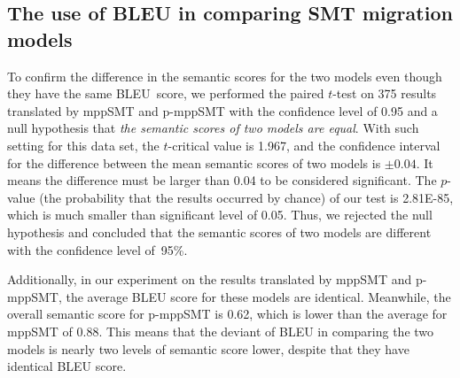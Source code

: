 \subsection{The use of BLEU in comparing SMT migration models}

To confirm the difference in the semantic scores for the two
models even though they have the same BLEU~score, we performed the
paired $t$-test\cite{geek_2015} on 375 results translated by mppSMT and
p-mppSMT with the confidence level of
0.95 and a null hypothesis that {\em the semantic scores of two models
are equal}. With such setting for this data set, the $t$-critical value is 1.967,
and the confidence interval for the difference between the mean semantic scores
of two models is $\pm0.04$. It means the difference must be larger than 0.04 to
be considered significant. The $p$-value (the probability
that the results occurred by chance) of our test is 2.81E-85, which is much
smaller than significant level of 0.05. Thus, we rejected the null hypothesis and concluded
that the semantic scores of two models are different with the confidence
level of~95\%.

Additionally, in our experiment on the results translated by mppSMT
and p-mppSMT, the average BLEU score for these models are
identical. Meanwhile, the overall semantic score for p-mppSMT is 0.62,
which is lower than the average for mppSMT of 0.88. This means that
the deviant of BLEU in comparing the two models is nearly two
levels of semantic score lower, despite that they have identical BLEU
score.



